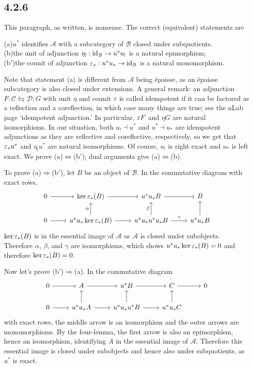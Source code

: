 \documentclass[deligne.tex]{subfiles}
\begin{document}
\subsection*{4.2.6}
This paragraph, as written, is nonsense.
The correct (equivalent) statements are

(a)\quad $u^*$ identifies $\mathcal A$ with a subcategory of $\mathcal B$ closed under subquotients. \\
\indent(b)\quad the unit of adjunction $\eta_!:\operatorname{id}_{\mathcal B}\rightarrow u^*u_!$ is a natural epimorphism;\\
\indent(b$'$)\quad the counit of adjunction $\varepsilon_*:u^*u_*\rightarrow\operatorname{id}_{\mathcal B}$ is a natural monomorphism.

Note that statement (a) is different from $\mathcal A$ being épaisse, as an
épaisse subcategory is also closed under extensions.
A general remark: an adjunction $F:\mathcal C\leftrightarrows\mathcal D:G$ 
with unit $\eta$ and counit $\varepsilon$ is called idempotent if it can be
factored as a reflection and a coreflection, in which case many things are
true; see the nLab page `idempotent adjunction.' In particular, $\varepsilon F$ and
$\eta G$ are natural isomorphisms. In our situation, both $u_!\dashv u^*$
and $u^*\dashv u_*$ are idempotent adjunctions as they are reflective and
coreflective, respectively, so we get that $\varepsilon_*u^*$ and $\eta_!u^*$ are
natural isomorphisms. Of course, $u_!$ is right exact and $u_*$ is left exact. We prove (a)$\Leftrightarrow$(b$'$); dual arguments give
(a)$\Leftrightarrow$(b).

To prove (a)$\Rightarrow$(b$'$), let $B$ be an object of $\mathcal B$.
In the commutative diagram with exact rows,
\begin{equation*}\begin{tikzcd}
	0\arrow[r]&\ker\vep_*(B)\arrow[r]&u^*u_*B\arrow[r]&B \\
	0\arrow[r]&u^*u_*\ker\vep_*(B)\arrow[u,"\alpha"]\arrow[r]&u^*u_*u^*u_*B\arrow[u,"\beta"]\arrow[r,"\gamma"]
	&u^*u_*B\arrow[u]
\end{tikzcd}\end{equation*}
$\ker\varepsilon_*(B)$ is in the essential image of $\mathcal A$ as $\mathcal A$ is
closed under subobjects. Therefore $\alpha$, $\beta$, and $\gamma$ are
isomorphisms, which shows $u^*u_*\ker\varepsilon_*(B)=0$ and therefore
$\ker\varepsilon_*(B)=0$.

Now let's prove (b$'$)$\Rightarrow$(a). In the commutative diagram
\begin{equation*}\begin{tikzcd}
	0\arrow[r]&A\arrow[r]&u^*B\arrow[r]&C\arrow[r]&0 \\
	0\arrow[r]&u^*u_*A\arrow[r]\arrow[u]
	&u^*u_*u^*B\arrow[u]\arrow[r]&u^*u_*C\arrow[u]
\end{tikzcd}\end{equation*}
with exact rows, the middle arrow is an isomorphism and the outer arrows
are monomorphisms. By the four-lemma, the first arrow is also an
epimorphism, hence an isomorphism, identifying $A$ in the essential image of
$\mathcal A$. Therefore this essential image is closed under subobjects and
hence also under subquotients, as $u^*$ is exact.
\end{document}
